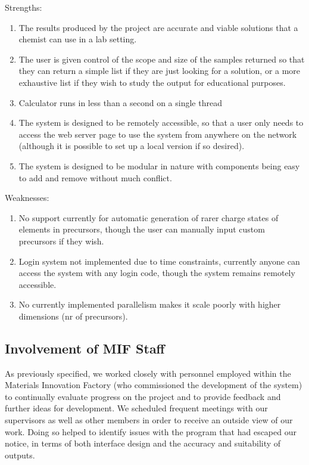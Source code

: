 Strengths:
\begin{enumerate}
    \item The results produced by the project are accurate and viable solutions that a chemist can use in a lab setting.
    
    \item The user is given control of the scope and size of the samples returned so that they can return a simple list if they are just looking for a solution, or a more exhaustive list if they wish to study the output for educational purposes.
    
    \item Calculator runs in less than a second on a single thread
    
    \item The system is designed to be remotely accessible, so that a user only needs to access the web server page to use the system from anywhere on the network (although it is possible to set up a local version if so desired).
    
    \item The system is designed to be modular in nature with components being easy to add and remove without much conflict.
\end{enumerate}

Weaknesses:
\begin{enumerate}
    \item No support currently for automatic generation of rarer charge states of elements in precursors, though the user can manually input custom precursors if they wish.
    
    \item Login system not implemented due to time constraints, currently anyone can access the system with any login code, though the system remains remotely accessible.
    
    \item No currently implemented parallelism makes it scale poorly with higher dimensions (nr of precursors).
\end{enumerate}

\subsection{Involvement of MIF Staff}
As previously specified, we worked closely with personnel employed within the Materials Innovation Factory (who commissioned the development of the system) to continually evaluate progress on the project and to provide feedback and further ideas for development. We scheduled frequent meetings with our supervisors as well as other members in order to receive an outside view of our work. Doing so helped to identify issues with the program that had escaped our notice, in terms of both interface design and the accuracy and suitability of outputs.

